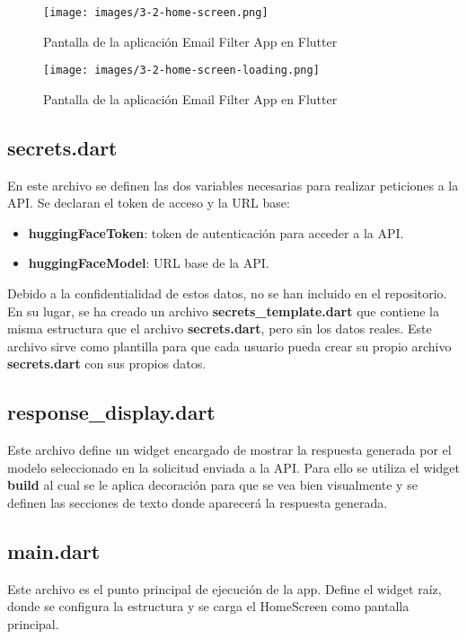 \documentclass[12pt]{article}
\begin{document}
\begin{figure}[H]
    \centering
    \texttt{[image: images/3-2-home-screen.png]}
    \caption{Pantalla de la aplicación Email Filter App en Flutter}
    \label{fig:3-2-home-screen}
\end{figure}

\begin{figure}[H]
    \centering
    \texttt{[image: images/3-2-home-screen-loading.png]}
    \caption{Pantalla de la aplicación Email Filter App en Flutter}
    \label{fig:3-2-home-screen-loading}
\end{figure}

\subsection{secrets.dart}

En este archivo se definen las dos variables necesarias para realizar peticiones a la API. Se declaran el token de acceso y la URL base:

\begin{itemize}
    \item \textbf{huggingFaceToken}: token de autenticación para acceder a la API.
    \item \textbf{huggingFaceModel}: URL base de la API.
\end{itemize}

Debido a la confidentialidad de estos datos, no se han incluido en el repositorio. En su lugar, se ha creado un archivo \textbf{secrets\_template.dart} que contiene la misma estructura que el archivo \textbf{secrets.dart}, pero sin los datos reales. Este archivo sirve como plantilla para que cada usuario pueda crear su propio archivo \textbf{secrets.dart} con sus propios datos.

\subsection{response\_display.dart}

Este archivo define un widget encargado de mostrar la respuesta generada por el modelo seleccionado en la solicitud enviada a la API. Para ello se utiliza el widget \textbf{build} al cual se le aplica decoración para que se vea bien visualmente y se definen las secciones de texto donde aparecerá la respuesta generada.

\subsection{main.dart}

Este archivo es el punto principal de ejecución de la app. Define el widget raíz, donde se configura la estructura y se carga el HomeScreen como pantalla principal.
\end{document}
